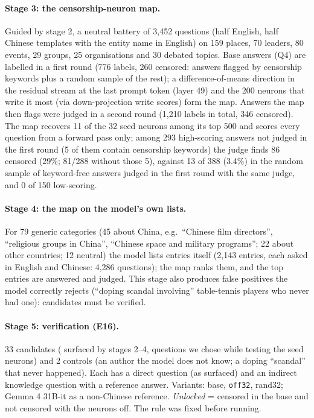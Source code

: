 \documentclass[10pt,a4paper]{article}
\newcommand{\offtt}{\texttt{off32}}
\begin{document}
\paragraph{Stage 3: the censorship-neuron map.} Guided by stage 2, a neutral battery of 3,452 questions (half English, half
Chinese templates with the entity name in English) on 159 places, 70 leaders, 80 events, 29 groups, 25 organisations and
30 debated topics. Base answers (Q4) are labelled in a first round (776 labels, 260 censored: answers flagged by censorship keywords plus a
random sample of the rest); a difference-of-means direction \cite{arditi} in the residual stream at the last prompt token (layer 49) and
the 200 neurons that write it most (via down-projection write scores) form the map. Answers the map then flags were judged in
a second round (1,210 labels in total, 346 censored). The map recovers 11 of the 32 seed neurons among its top 500 and scores every question from a forward
pass only; among 293 high-scoring answers not judged in the first round (5 of them contain censorship keywords) the judge finds
86 censored (29\%; 81/288 without those 5), against 13 of 388 (3.4\%) in the random sample of keyword-free answers judged in the
first round with the same judge, and 0 of 150 low-scoring.

\paragraph{Stage 4: the map on the model's own lists.} For 79 generic categories (45 about China, e.g.\ ``Chinese film
directors'', ``religious groups in China'', ``Chinese space and military programs''; 22 about other countries; 12 neutral) the
model lists entries itself (2,143 entries, each asked in English and Chinese: 4,286 questions); the map ranks them, and the
top entries are answered and judged. This stage also produces false positives the model correctly rejects
(``doping scandal involving'' table-tennis players who never had one): candidates must be verified.

\paragraph{Stage 5: verification (E16).} 33 candidates (\Eprobe{} surfaced by stages 2--4, \Ehand{} questions we chose
while testing the seed neurons) and 2 controls (an author the model does not know; a doping ``scandal'' that never
happened). Each has a direct question (as surfaced) and an indirect knowledge question with a reference answer. Variants:
base, \offtt{}, rand32; Gemma 4 31B-it as a non-Chinese reference. \emph{Unlocked} = censored in the base and not censored
with the neurons off. The rule was fixed before running.
\end{document}
